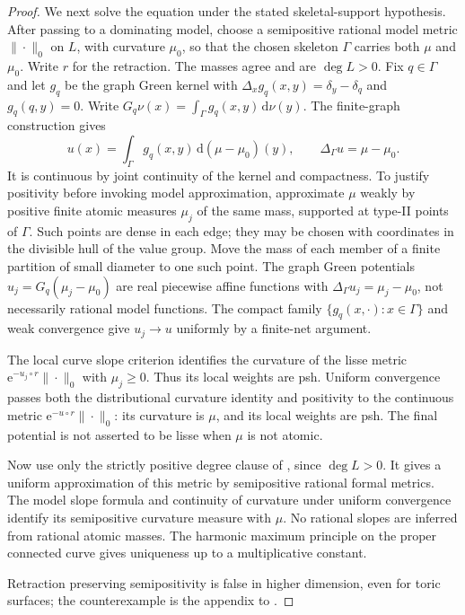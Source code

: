\begin{proof}
We next solve the equation under the stated skeletal-support hypothesis.
After passing to a dominating model, choose a semipositive rational model
metric $\|\cdot\|_0$ on $L$, with curvature $\mu_0$, so that the chosen
skeleton $\Gamma$ carries both $\mu$ and $\mu_0$.  Write $r$ for the
retraction.  The masses agree and are $\deg L>0$.
Fix $q\in\Gamma$ and let $g_q$ be the graph Green kernel with
$\Delta_xg_q(x,y)=\delta_y-\delta_q$ and $g_q(q,y)=0$.
Write $G_q\nu(x)=\int_\Gamma g_q(x,y)\,\mathrm d\nu(y)$.
The finite-graph construction gives
\[
 u(x)=\int_\Gamma g_q(x,y)\,\mathrm d(\mu-\mu_0)(y),
 \qquad \Delta_\Gamma u=\mu-\mu_0.
\]
It is continuous by joint continuity of the kernel and compactness.
To justify positivity before invoking model approximation, approximate
\(\mu\) weakly by positive finite atomic measures \(\mu_j\) of the
same mass, supported at type-II points of \(\Gamma\).  Such points are
dense in each edge; they may be chosen with coordinates in the divisible
hull of the value group.  Move the mass of each member of a finite
partition of small diameter to one such point.  The graph Green potentials
\(u_j=G_q(\mu_j-\mu_0)\) are real piecewise affine functions with
\(\Delta_\Gamma u_j=\mu_j-\mu_0\), not necessarily rational model
functions.  The compact family \(\{g_q(x,\cdot):x\in\Gamma\}\) and
weak convergence give \(u_j\to u\) uniformly by a finite-net argument.

The local curve slope criterion identifies the curvature of the lisse
metric \(\mathrm e^{-u_j\circ r}\|\cdot\|_0\) with
\(\mu_j\geq0\).  Thus its local weights are psh.  Uniform convergence
passes both the distributional curvature identity and positivity to the
continuous metric \(\mathrm e^{-u\circ r}\|\cdot\|_0\): its
curvature is \(\mu\), and its local weights are psh.  The final potential
is not asserted to be lisse when \(\mu\) is not atomic.

Now use only the strictly positive degree clause of
, since \(\deg L>0\).
It gives a uniform approximation of this metric by semipositive rational
formal metrics.  The model slope formula and continuity of curvature
under uniform convergence identify its semipositive curvature measure
with \(\mu\).  No rational slopes are inferred from rational atomic
masses.  The harmonic maximum principle on the proper connected curve
gives uniqueness up to a multiplicative constant.

Retraction preserving semipositivity is false in higher dimension, even for
toric surfaces; the counterexample is the appendix to \cite{GJKM19}.
\end{proof}

